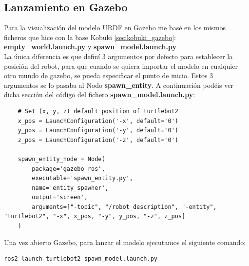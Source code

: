\subsection{Lanzamiento en Gazebo}
\label{sec:turtlebot2_gazebo}

Para la visualización del modelo URDF en Gazebo me basé en los mismos ficheros que hice con la base Kobuki \ref{sec:kobuki_gazebo}: \textbf{empty\_world.launch.py} y \textbf{spawn\_model.launch.py}\\

La única diferencia es que definí 3 argumentos por defecto para establecer la posición del robot, para que cuando se quiera importar el modelo en cualquier otro mundo de gazebo, se pueda especificar el punto de inicio. Estos 3 argumentos se lo pasaba al Nodo \textbf{spawn\_entity}. A continuación podéis ver dicha sección del código del fichero \textbf{spawn\_model.launch.py}:
\begin{lstlisting}
	# Set (x, y, z) default position of turtlebot2
	x_pos = LaunchConfiguration('-x', default='0')
	y_pos = LaunchConfiguration('-y', default='0')
	z_pos = LaunchConfiguration('-z', default='0')
	
	spawn_entity_node = Node(
		package='gazebo_ros',
		executable='spawn_entity.py',
		name='entity_spawner',
		output='screen',
		arguments=["-topic", "/robot_description", "-entity", "turtlebot2", "-x", x_pos, "-y", y_pos, "-z", z_pos]
	)
\end{lstlisting}

Una vez abierto Gazebo, para lanzar el modelo ejecutamos el siguiente comando:
\begin{lstlisting}
ros2 launch turtlebot2 spawn_model.launch.py
\end{lstlisting}

